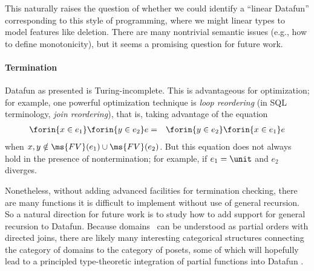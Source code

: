 This naturally raises the question of whether we could identify a
``linear Datafun'' corresponding to this style of programming, where
we might linear types to model features like deletion. There are many
nontrivial semantic issues (e.g., how to define monotonicity), but
it seems a promising question for future work.

\paragraph{Termination}

Datafun as presented is Turing-incomplete. This is advantageous for
optimization; for example, one powerful optimization technique is \emph{loop
  reordering} (in SQL terminology, \emph{join reordering}), that is, taking
advantage of the equation
\begin{eqnarray*}
  \forin{x \in e_1} \forin{y \in e_2} e
  &=& \forin{y \in e_2} \forin{x \in e_1} e
\end{eqnarray*}
when $x,y \notin \ms{FV}(e_1) \cup \ms{FV}(e_2)$. But this equation does not
always hold in the presence of nontermination; for example, if $e_1 = \unit$ and
$e_2$ diverges.

Nonetheless, without adding advanced facilities for termination
checking, there are many functions it is difficult to implement
without use of general recursion. So a natural direction for future
work is to study how to add support for general recursion to Datafun.
Because domains~\cite{domain-theory} can be understood as partial
orders with directed joins, there are likely many interesting
categorical structures connecting the category of domains to the
category of posets, some of which will hopefully lead to a principled
type-theoretic integration of partial functions into Datafun .

%

